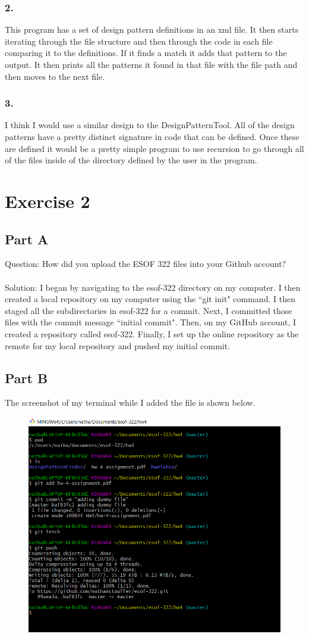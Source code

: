 \documentclass{article}
\begin{document}
\subsubsection*{2.}
This program has a set of design pattern definitions in an xml file. It then starts iterating through the file structure and then through the code in each file comparing it to the definitions. If it finds a match it adds that pattern to the output. It then prints all the patterns it found in that file with the file path and then moves to the next file. 
\subsubsection*{3.}
I think I would use a similar design to the DesignPatternTool. All of the design patterns have a pretty distinct signature in code that can be defined. Once these are defined it would be a pretty simple program to use recursion to go through all of the files inside of the directory defined by the user in the program.   


\newpage

\section*{Exercise 2}

\subsection*{Part A}
Question: How did you upload the ESOF 322 files into your Github account? \\\\
Solution: I began by navigating to the esof-322 directory on my computer. I then created a local repository on my computer using the ``git init" command. 
I then staged all the subdirectories in esof-322 for a commit. Next, I committed those files with the commit message ``initial commit".
Then, on my GitHub account, I created a repository called esof-322.
Finally, I set up the online repository as the remote for my local repository and pushed my initial commit.

\subsection*{Part B}

The screenshot of my terminal while I added the file is shown below.
\begin{figure}[h]
	\centering
	\includegraphics[width=5in]{dummy-file.jpg}
\end{figure}
\end{document}
